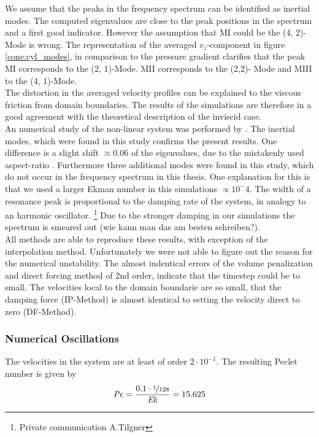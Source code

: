 We assume that the peaks in the frequency spectrum can be identified as inertial modes.
The computed eigenvalues  are close to the peak positions in the spectrum and a first good indicator.
However  the assumption that M\RN{1} could be the (4, 2)-Mode is wrong.
The representation of the averaged $v_z$-component in figure \ref{cone:cyl_modes}, in comparison to the pressure gradient
clarifies that the peak M\RN{1} corresponds to the (2, 1)-Mode.
M\RN{2} corresponds to the (2,2)- Mode and M\RN{3}  to the (4, 1)-Mode.\\
The distortion in the averaged velocity profiles can be explained to the viscous friction from domain boundaries.
The results of the simulations are therefore in a good agreement with the theoretical description of the inviscid case.
\\
An numerical study of the non-linear system was performed by \citep{Sauret2012}.
The inertial modes, which were found in this study confirms the present results.
One difference is a slight shift $\approx0.06$ of the eigenvalues,
due to the mistakenly used aspect-ratio .
Furthermore three additional modes were found in this study, which do not occur
in the frequency spectrum in this thesis.
One explanation for this is that we used a  larger Ekman number in this simulations $\propto10^-4$.
The width of a resonance peak is proportional to the damping rate of the system, in analogy to an harmonic oscillator.
\footnote{Private communication A.Tilgner}
Due to the stronger damping in our simulations the spectrum is smeared out (wie kann man das am besten schreiben?).\\
All methods are able to reproduce these results, with exception of the interpolation method.
Unfortunately we were not able to figure out the reason for the numerical unstability.
The almost indentical errors of the volume penalization and direct forcing method of 2nd order,
indicate that the timestep could be to small.
The velocities local to the domain boundarie are so small, that the damping force (IP-Method) is almost identical
to setting the velocity direct to zero (DF-Method).

\subsubsection{Numerical Oscillations}

The velocities in the system are at least of order $2\cdot10^{-1}$. The resulting Peclet number is
given by
\begin{align}
    \mbox{\textit{Pe}} = \frac{0.1\cdot\nicefrac{1}{128}}{\mbox{\textit{Ek}}} =15.625
\end{align}

